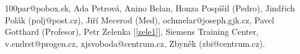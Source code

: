 
100par@pobox.sk,
Ada Petrová,
Anino Belan,
Honza Pospíšil (Pedro),
Jindřich Polák (polj@post.cz),
Jiří Mecerod (Med),
ochmelar@joseph.gjk.cz,
Pavel Gotthard (Profesor),
Petr Zelenka [\ref{zele1}],
Siemens Training Center,
v.endrst@progen.cz,
xjsvoboda@centrum.cz,
Zbyněk (zbi@centrum.cz).

